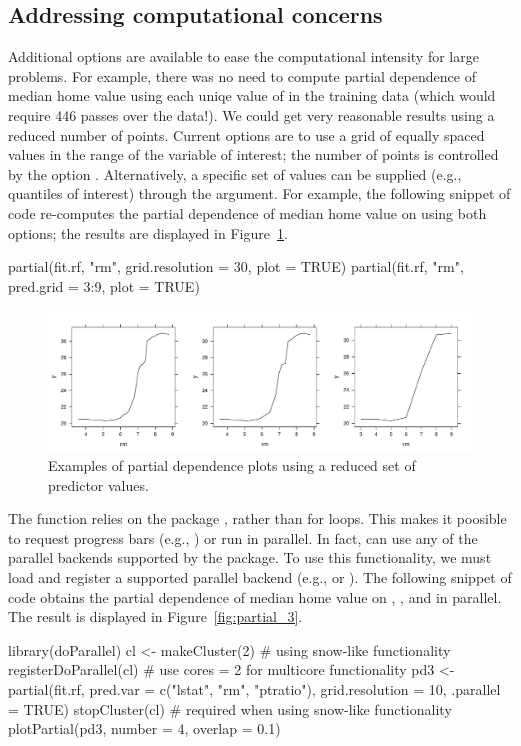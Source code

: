 \subsection{Addressing computational concerns}

Additional options are available to ease the computational intensity for large problems. For example, there was no need to compute partial dependence of median home value using each uniqe value of  in the training data (which would require 446 passes over the data!). We could get very reasonable results using a reduced number of points. Current options are to use a grid of equally spaced values in the range of the variable of interest; the number of points is controlled by the option . Alternatively, a specific set of values can be supplied (e.g., quantiles of interest) through the  argument. For example, the following snippet of code re-computes the partial dependence of median home value on  using both options; the results are displayed in Figure~\ref{fig:partial_manual}.
\begin{example}
partial(fit.rf, "rm", grid.resolution = 30, plot = TRUE)
partial(fit.rf, "rm", pred.grid = 3:9, plot = TRUE)
\end{example}

\begin{figure}[htbp]
  \centering
  \includegraphics[width=0.8\linewidth]{partial_manual}
  \caption{Examples of partial dependence plots using a reduced set of predictor values.}
  \label{fig:partial_manual}
\end{figure}

The  function relies on the  package \citep{plyr-pkg}, rather than for loops. This makes it poosible to request progress bars (e.g., ) or run  in parallel. In fact,  can use any of the parallel backends supported by the  package. To use this functionality, we must load and register a supported parallel backend (e.g.,  or ). The following snippet of code obtains the partial dependence of median home value on , , and  in parallel. The result is displayed in Figure~\ref{fig:partial_3}.
\begin{example}
library(doParallel)
cl <- makeCluster(2)  # using snow-like functionality
registerDoParallel(cl)  # use cores = 2 for multicore functionality
pd3 <- partial(fit.rf, pred.var = c("lstat", "rm", "ptratio"),
               grid.resolution = 10, .parallel = TRUE)
stopCluster(cl)  # required when using snow-like functionality
plotPartial(pd3, number = 4, overlap = 0.1)
\end{example}

